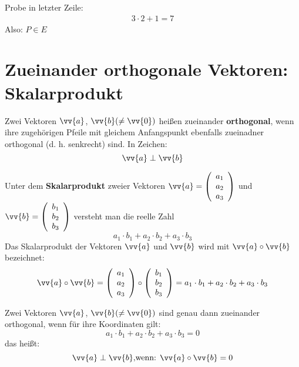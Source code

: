 Probe in letzter Zeile:
\begin{gather*}
    3 \cdot 2 + 1 = 7
\end{gather*}
Also: $P \in E$

\section{Zueinander orthogonale Vektoren: Skalarprodukt}

\begin{definition}
    Zwei Vektoren $\vv{a}$, $\vv{b} (\neq \vv{0})$  heißen zueinander \textbf{orthogonal}, wenn ihre zugehörigen Pfeile mit gleichem Anfangspunkt ebenfalls zueinadner orthogonal (d. h. senkrecht) sind. In Zeichen: 
    $$\vv{a} \perp \vv{b}$$
\end{definition}

\begin{definition}
    Unter dem \textbf{Skalarprodukt} zweier Vektoren $\vv{a} = \left(\begin{array}{c}  a_1 \\ a_2 \\ a_3 \end{array}\right)$ und \\ $\vv{b} = \left(\begin{array}{c}  b_1 \\ b_2 \\ b_3 \end{array}\right)$ versteht man die reelle Zahl 
    $$a_1 \cdot b_1 + a_2 \cdot b_2 + a_3 \cdot b_3$$
    Das Skalarprodukt der Vektoren $\vv{a}$ und $\vv{b}$ wird mit $\vv{a} \circ \vv{b}$ bezeichnet:
    $$\vv{a} \circ \vv{b} = \left(\begin{array}{c}  a_1 \\ a_2 \\ a_3 \end{array}\right) \circ \left(\begin{array}{c}  b_1 \\ b_2 \\ b_3 \end{array}\right) = a_1 \cdot b_1 + a_2 \cdot b_2 + a_3 \cdot b_3$$
\end{definition}

\begin{satz}[Orthogonalitätskriterium]
    Zwei Vektoren $\vv{a}$, $\vv{b} (\neq \vv{0})$ sind genau dann zueinander orthogonal, wenn für ihre Koordinaten gilt:
    $$a_1 \cdot b_1 + a_2 \cdot b_2 + a_3 \cdot b_3 = 0$$
    das heißt:
    $$\vv{a} \perp \vv{b} \text{,wenn: } \vv{a} \circ \vv{b} = 0$$
\end{satz}

